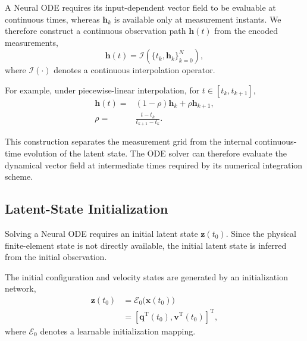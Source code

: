 \documentclass[journal,twoside]{IEEEtran}
\begin{document}
A Neural ODE requires its input-dependent vector field to be evaluable at
continuous times, whereas $\mathbf{h}_k$ is available only at measurement
instants. We therefore construct a continuous observation path
$\mathbf{h}(t)$ from the encoded measurements,
\begin{equation}
    \mathbf{h}(t)
    =
    \mathcal{I}
    \left(
        \{t_k,\mathbf{h}_k\}_{k=0}^{N}
    \right),
    \label{eq:continuous_observation}
\end{equation}
where $\mathcal{I}(\cdot)$ denotes a continuous interpolation operator.

For example, under piecewise-linear interpolation, for
$t\in[t_k,t_{k+1}]$,
\begin{equation}
\begin{aligned}
    \mathbf{h}(t)
    ={}&
    (1-\rho)\mathbf{h}_k
    +
    \rho\mathbf{h}_{k+1},\\
    \rho
    ={}&
    \frac{t-t_k}{t_{k+1}-t_k}.
\end{aligned}
\label{eq:linear_interpolation}
\end{equation}

This construction separates the measurement grid from the internal
continuous-time evolution of the latent state. The ODE solver can therefore
evaluate the dynamical vector field at intermediate times required by its
numerical integration scheme.


\subsection{Latent-State Initialization}
\label{subsec:initialization}

Solving a Neural ODE requires an initial latent state
$\mathbf{z}(t_0)$. Since the physical finite-element state is not directly
available, the initial latent state is inferred from the initial observation.

The initial configuration and velocity states are generated by an
initialization network,
\begin{equation}
\begin{aligned}
    \mathbf{z}(t_0)
    &=
    \mathcal{E}_{0}
    \big(
        \mathbf{x}(t_0)
    \big)\\
    &=
    \left[
        \mathbf{q}^{\mathrm T}(t_0),
        \mathbf{v}^{\mathrm T}(t_0)
    \right]^{\mathrm T},
\end{aligned}
\label{eq:initial_state}
\end{equation}
where $\mathcal{E}_{0}$ denotes a learnable initialization mapping.
\end{document}
